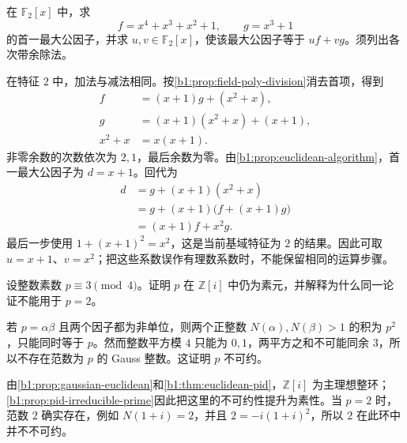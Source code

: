 \begin{exercise}\label{b1:ex:11-polynomial-euclid}
	在 \(\mathbb F_2[x]\) 中，求
	\[
		f=x^4+x^3+x^2+1,\qquad g=x^3+1
	\]
	的首一最大公因子，并求 \(u,v\in\mathbb F_2[x]\)，使该最大公因子等于 \(uf+vg\)。须列出各次带余除法。
\end{exercise}
\begin{solution}
	在特征 \(2\) 中，加法与减法相同。按\cref{b1:prop:field-poly-division}消去首项，得到
	\[
		\begin{aligned}
			f&=(x+1)g+(x^2+x),\\
			g&=(x+1)(x^2+x)+(x+1),\\
			x^2+x&=x(x+1).
		\end{aligned}
	\]
	非零余数的次数依次为 \(2,1\)，最后余数为零。由\cref{b1:prop:euclidean-algorithm}，首一最大公因子为 \(d=x+1\)。回代为
	\[
		\begin{aligned}
			d&=g+(x+1)(x^2+x)\\
			&=g+(x+1)\bigl(f+(x+1)g\bigr)\\
			&=(x+1)f+x^2g.
		\end{aligned}
	\]
	最后一步使用 \(1+(x+1)^2=x^2\)，这是当前基域特征为 \(2\) 的结果。因此可取 \(u=x+1\)、\(v=x^2\)；把这些系数误作有理数系数时，不能保留相同的运算步骤。
\end{solution}

\begin{exercise}\label{b1:ex:11-gaussian-rational-prime}
	设整数素数 \(p\equiv3\pmod4\)。证明 \(p\) 在 \(\mathbb Z[i]\) 中仍为素元，并解释为什么同一论证不能用于 \(p=2\)。
\end{exercise}
\begin{solution}
	若 \(p=\alpha\beta\) 且两个因子都为非单位，则两个正整数 \(N(\alpha),N(\beta)>1\) 的积为 \(p^2\)，只能同时等于 \(p\)。然而整数平方模 \(4\) 只能为 \(0,1\)，两平方之和不可能同余 \(3\)，所以不存在范数为 \(p\) 的 Gauss 整数。这证明 \(p\) 不可约。

	由\cref{b1:prop:gaussian-euclidean}和\cref{b1:thm:euclidean-pid}，\(\mathbb Z[i]\) 为主理想整环；\cref{b1:prop:pid-irreducible-prime}因此把这里的不可约性提升为素性。当 \(p=2\) 时，范数 \(2\) 确实存在，例如 \(N(1+i)=2\)，并且 \(2=-i(1+i)^2\)，所以 \(2\) 在此环中并不不可约。
\end{solution}

